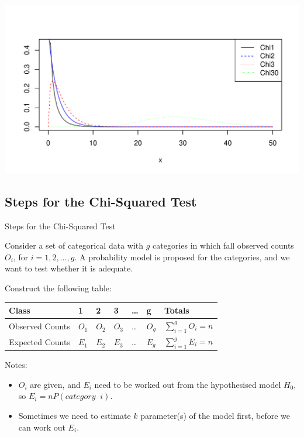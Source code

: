 \documentclass[t,xcolor=pdftex,dvipsnames,table]{beamer}\usepackage[]{graphicx}\usepackage[]{color}
\makeatletter
\def\maxwidth{ %
  \ifdim\Gin@nat@width>\linewidth
    \linewidth
  \else
    \Gin@nat@width
  \fi
}
\newenvironment{knitrout}{}{} %
\makeatother
\begin{document}
\begin{frame}[fragile]\frametitle{}
\begin{knitrout}
\color{fgcolor}
\includegraphics[width=\maxwidth]{figure/unnamed-chunk-150-1} 

\end{knitrout}
\end{frame}


\subsection[GoodnessofFit]{Steps for the Chi-Squared Test}
\begin{frame}[fragile]{Steps for the Chi-Squared Test}

Consider a set of categorical data with $g$ categories in which fall observed counts $O_{i}$, for $i=1,2,\ldots,g$. A probability model is proposed for the categories, and we want to test whether it is adequate.

\vspace{.5cm}
Construct the following table:

\begin{center}
\begin{tabular}{|l|lllll|l|} \hline
Class & 1 & 2 & 3 & \ldots & g & Totals \\ \hline
Observed Counts & $O_{1}$ & $O_{2}$ & $O_{3}$ & \ldots & $O_{g}$ & $\sum_{i=1}^{g} O_{i} = n$ \\
Expected Counts & $E_{1}$ & $E_{2}$ & $E_{3}$ & \ldots & $E_{g}$ & $\sum_{i=1}^{g} E_{i} = n$ \\ \hline
\end{tabular}
\end{center}

\vspace{.5cm}
Notes:
\begin{itemize}
\item $O_{i}$ are given, and $E_{i}$ need to be worked out from the hypothesised model $H_{0}$, so   $E_{i} = n P(category \;\; i)$.
\item Sometimes we need to estimate $k$ parameter(s) of the model first, before we can work out $E_{i}$.
\end{itemize}
\end{frame} 
\end{document}
